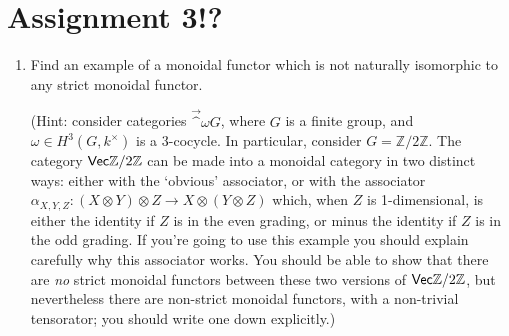 \documentclass[12pt]{amsart}
\begin{document}
\section{Assignment 3!?}
\begin{enumerate}


\item Find an example of a monoidal functor which is not naturally isomorphic to any strict monoidal functor.

(Hint: consider categories $\Vec^\omega G$, where $G$ is a finite group, and $\omega \in H^3(G, k^\times)$ is a 3-cocycle. In particular, consider $G = \mathbb Z / 2 \mathbb Z$. The category $\Vec \mathbb Z / 2 \mathbb Z$ can be made into a monoidal category in two
distinct ways: either with the `obvious' associator, or with the associator $\alpha_{X, Y, Z} : (X \otimes Y) \otimes Z \to X \otimes (Y \otimes Z)$ which, when $Z$ is 1-dimensional, is either the identity if $Z$ is in the even grading, or minus the identity if $Z$ is in the odd grading. If you're going to use this example you should explain carefully why this associator works. You should be able to show that there are \emph{no} strict monoidal functors between these two versions of $\Vec \mathbb Z / 2 \mathbb Z$, but nevertheless there are non-strict monoidal functors, with a non-trivial tensorator; you should write one down explicitly.)


\end{enumerate}
\end{document}
